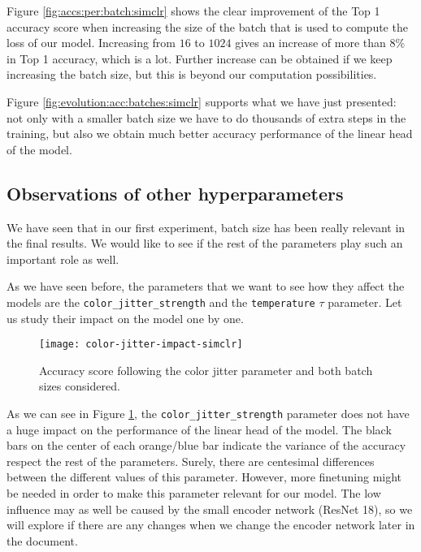Figure \ref{fig:accs:per:batch:simclr} shows the clear improvement of the Top 1 accuracy score when increasing the size of the batch that is used to compute the loss of our model. Increasing from $16$ to $1024$ gives an increase of more than $8\%$ in Top 1 accuracy, which is a lot. Further increase can be obtained if we keep increasing the batch size, but this is beyond our computation possibilities.

Figure \ref{fig:evolution:acc:batches:simclr} supports what we have just presented: not only with a smaller batch size we have to do thousands of extra steps in the training, but also we obtain much better accuracy performance of the linear head of the model.

\subsection*{Observations of other hyperparameters}

We have seen that in our first experiment, batch size has been really relevant in the final results. We would like to see if the rest of the parameters play such an important role as well. 

As we have seen before, the parameters that we want to see how they affect the models are the \lstinline{color_jitter_strength} and the \lstinline{temperature} $\tau$ parameter. Let us study their impact on the model one by one. 

\begin{figure}[H] 
    \centering
    \texttt{[image: color-jitter-impact-simclr]}%
    
    \caption{Accuracy score following the color jitter parameter and both batch sizes considered.}
    
    \label{exp:simclr:colorjitter:impact}
\end{figure}

As we can see in Figure \ref{exp:simclr:colorjitter:impact}, the \lstinline{color_jitter_strength} parameter does not have a huge impact on the performance of the linear head of the model. The black bars on the center of each orange/blue bar indicate the variance of the accuracy respect the rest of the parameters. Surely, there are centesimal differences between the different values of this parameter. However, more finetuning might be needed in order to make this parameter relevant for our model. The low influence may as well be caused by the small encoder network (ResNet 18), so we will explore if there are any changes when we change the encoder network later in the document.

